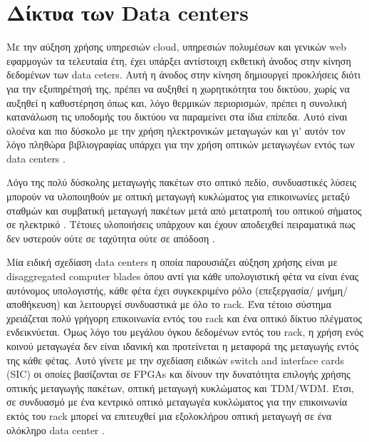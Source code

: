 \section{Δίκτυα των Data centers}

Με την αύξηση χρήσης υπηρεσιών cloud, υπηρεσιών πολυμέσων και
γενικών web εφαρμογών τα τελευταία έτη, έχει υπάρξει αντίστοιχη
εκθετική άνοδος στην κίνηση δεδομένων των data ceters. Αυτή η άνοδος
στην κίνηση δημιουργεί προκλήσεις διότι για την εξυπηρέτησή της,
πρέπει να αυξηθεί η χωρητικότητα του δικτύου, χωρίς να αυξηθεί η
καθυστέρηση όπως και, λόγο θερμικών περιορισμών, πρέπει η συνολική
κατανάλωση τις υποδομής του δικτύου να παραμείνει στα ίδια
επίπεδα. Αυτό είναι ολοένα και πιο δύσκολο με την χρήση ηλεκτρονικών
μεταγωγών και γι' αυτόν τον λόγο πληθώρα βιβλιογραφίας υπάρχει για την
χρήση οπτικών μεταγωγέων εντός των data centers \cite{6129370}.

Λόγο της πολύ δύσκολης μεταγωγής πακέτων στο οπτικό πεδίο,
συνδυαστικές λύσεις μπορούν να υλοποιηθούν με οπτική μεταγωγή
κυκλώματος για επικοινωνίες μεταξύ σταθμών και συμβατική μεταγωγή
πακέτων μετά από μετατροπή του οπτικού σήματος σε ηλεκτρικό
\cite{6533163} \cite{Helios}. Τέτοιες υλοποιήσεις
υπάρχουν και έχουν αποδειχθεί πειραματικά πως δεν υστερούν ούτε σε
ταχύτητα ούτε σε απόδοση \cite{6533163}.

Μία ειδική σχεδίαση data centers η οποία παρουσιάζει αύξηση χρήσης
είναι με disaggregated computer blades όπου αντί για κάθε υπολογιστική
φέτα να είναι ένας αυτόνομος υπολογιστής, κάθε φέτα έχει συγκεκριμένο
ρόλο (επεξεργασία/ μνήμη/ αποθήκευση) και λειτουργεί συνδυαστικά με
όλο το rack. Ένα τέτοιο σύστημα χρειάζεται πολύ γρήγορη επικοινωνία
εντός του rack και ένα οπτικό δίκτυο πλέγματος ενδεικνύεται. Όμως λόγο
του μεγάλου όγκου δεδομένων εντός του rack, η χρήση ενός κοινού
μεταγωγέα δεν είναι ιδανική και προτείνεται η μεταφορά της μεταγωγής
εντός της κάθε φέτας. Αυτό γίνετε με την σχεδίαση ειδικών switch and
interface cards (SIC) οι οποίες βασίζονται σε FPGAs και δίνουν την
δυνατότητα επιλογής χρήσης οπτικής μεταγωγής πακέτων, οπτική μεταγωγή
κυκλώματος και TDM/WDM. Έτσι, σε συνδυασμό με ένα κεντρικό οπτικό
μεταγωγέα κυκλώματος για την επικοινωνία εκτός του rack μπορεί να
επιτευχθεί μια εξολοκλήρου οπτική μεταγωγή σε ένα ολόκληρο data
center \cite{7383226}.

 
